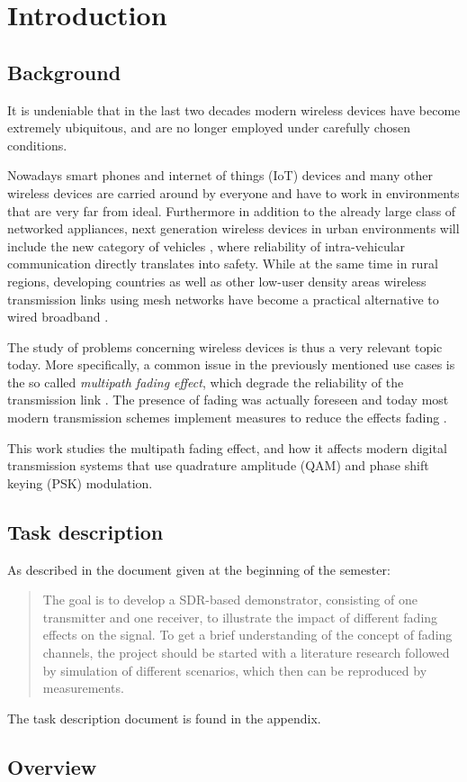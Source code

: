 
\chapter{Introduction}

\section{Background}

It is undeniable that in the last two decades modern wireless devices have become extremely ubiquitous, and are no longer employed under carefully chosen conditions.

Nowadays smart phones and internet of things (IoT) devices and many other wireless devices are carried around by everyone and have to work in environments that are very far from ideal. Furthermore in addition to the already large class of networked appliances, next generation wireless devices in urban environments will include the new category of vehicles \cite{AntonescuTB17}, where reliability of intra-vehicular communication directly translates into safety. While at the same time in rural regions, developing countries as well as other low-user density areas wireless transmission links using mesh networks have become a practical alternative to wired broadband \cite{Macmillan2019tidal,Subramanian2006rethinking,Flickenger2007wireless}.

The study of problems concerning wireless devices is thus a very relevant topic today. More specifically, a common issue in the previously mentioned use cases is the so called \emph{multipath fading effect}, which degrade the reliability of the transmission link \cite{Mathis, Gallager}. The presence of fading was actually foreseen \cite{Frederiksen2002overview,Maddocks1993introduction} and today most modern transmission schemes implement measures to reduce the effects fading \cite{Mathis,Hsu}.

This work studies the multipath fading effect, and how it affects modern digital transmission systems that use quadrature amplitude (QAM) and phase shift keying (PSK) modulation.

\section{Task description}

As described in the document given at the beginning of the semester:
\begin{quote}
	The goal is to develop a SDR-based demonstrator, consisting of one transmitter and one receiver, to illustrate the impact of different fading effects on the signal. To get a brief understanding of the concept of fading channels, the project should be started with a literature research followed by simulation of different scenarios, which then can be reproduced by measurements.
\end{quote}
The task description document is found in the appendix.

\section{Overview}

